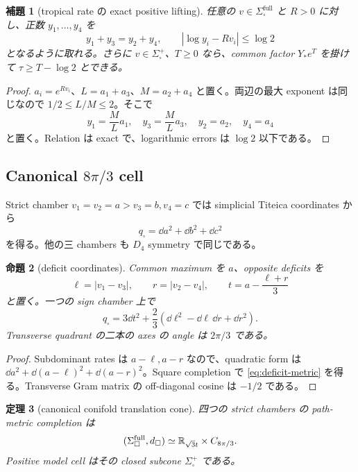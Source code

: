 \documentclass[11pt,a4paper]{ltjsarticle}
\newcommand{\Sigfull}{\Sigma_{\square}^{\mathrm{full}}}
\newcommand{\Sigplus}{\Sigma_{\square}^{+}}
\theoremstyle{plain}
\newtheorem{theorem}{定理}[section]\newtheorem{proposition}[theorem]{命題}
\newtheorem{lemma}[theorem]{補題}\newtheorem{corollary}[theorem]{系}
\theoremstyle{definition}
\theoremstyle{remark}
\begin{document}
\begin{lemma}[tropical rate の exact positive lifting]\label{lem:exact-positive-lift}
任意の $v\in\Sigfull$ と $R>0$ に対し、正数 $y_1,\dots,y_4$ を
\[
 y_1+y_3=y_2+y_4,
 \qquad
 |\log y_i-Rv_i|\le\log2
\]
となるように取れる。さらに $v\in\Sigplus$、$T\ge0$ なら、common factor $Y_*e^T$ を掛けて $\tau\ge T-\log2$ とできる。
\end{lemma}

\begin{proof}
$a_i=e^{Rv_i}$、$L=a_1+a_3$、$M=a_2+a_4$ と置く。両辺の最大 exponent は同じなので $1/2\le L/M\le2$。そこで
\[
 y_1=\frac ML a_1,
 \quad y_3=\frac ML a_3,
 \quad y_2=a_2,
 \quad y_4=a_4
\]
と置く。Relation は exact で、logarithmic errors は $\log2$ 以下である。
\end{proof}

\subsection{Canonical \texorpdfstring{$8\pi/3$}{8pi/3} cell}
Strict chamber $v_1=v_2=a>v_3=b,v_4=c$ では simplicial Titeica coordinates から
\[
 q_{\square}=\dd a^2+\dd b^2+\dd c^2
\]
を得る。他の三 chambers も $D_4$ symmetry で同じである。

\begin{proposition}[deficit coordinates]\label{prop:deficit-form}
Common maximum を $a$、opposite deficits を
\[
 \ell=|v_1-v_3|,
 \qquad r=|v_2-v_4|,
 \qquad t=a-\frac{\ell+r}{3}
\]
と置く。一つの sign chamber 上で
\begin{equation}\label{eq:deficit-metric}
 q_{\square}=3\dd t^2+\frac23(\dd\ell^2-\dd\ell\,\dd r+\dd r^2).
\end{equation}
Transverse quadrant の二本の axes の angle は $2\pi/3$ である。
\end{proposition}

\begin{proof}
Subdominant rates は $a-\ell,a-r$ なので、quadratic form は
$\dd a^2+\dd(a-\ell)^2+\dd(a-r)^2$。Square completion で \cref{eq:deficit-metric} を得る。Transverse Gram matrix の off-diagonal cosine は $-1/2$ である。
\end{proof}

\begin{theorem}[canonical conifold translation cone]\label{thm:translation-cone}
四つの strict chambers の path-metric completion は
\[
 (\Sigfull,d_{\square})\simeq\RR_{\sqrt3t}\times C_{8\pi/3}.
\]
Positive model cell はその closed subcone $\Sigplus$ である。
\end{theorem}
\end{document}
